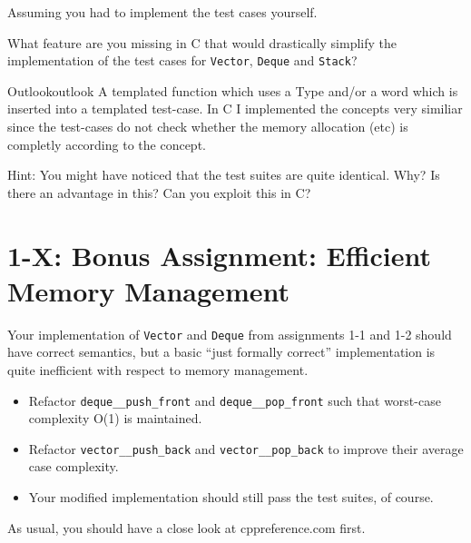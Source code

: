 \documentclass[]{article}
\providecommand{\tightlist}{%
  \setlength{\itemsep}{0pt}\setlength{\parskip}{0pt}}
\begin{document}
Assuming you had to implement the test cases yourself.

What feature are you missing in C that would drastically simplify the
implementation of the test cases for \texttt{Vector}, \texttt{Deque} and
\texttt{Stack}?
  \begin{example}{Outlook}{outlook}
    A templated function which uses a Type and/or a word which is inserted into a templated test-case.
    In C I implemented the concepts very similiar since the test-cases do not check whether the memory allocation (etc) is completly according to the concept.
  \end{example}

Hint: You might have noticed that the test suites are quite identical.
Why? Is there an advantage in this? Can you exploit this in C?

\section{1-X: Bonus Assignment: Efficient Memory
Management}\label{x-bonus-assignment-efficient-memory-management}

Your implementation of \texttt{Vector} and \texttt{Deque} from
assignments 1-1 and 1-2 should have correct semantics, but a basic
``just formally correct'' implementation is quite inefficient with
respect to memory management.

\begin{itemize}
\tightlist
\item
  Refactor \texttt{deque\_\_push\_front} and
  \texttt{deque\_\_pop\_front} such that worst-case complexity O(1) is
  maintained.
\item
  Refactor \texttt{vector\_\_push\_back} and
  \texttt{vector\_\_pop\_back} to improve their average case complexity.
\item
  Your modified implementation should still pass the test suites, of
  course.
\end{itemize}

As usual, you should have a close look at cppreference.com first.
\end{document}
